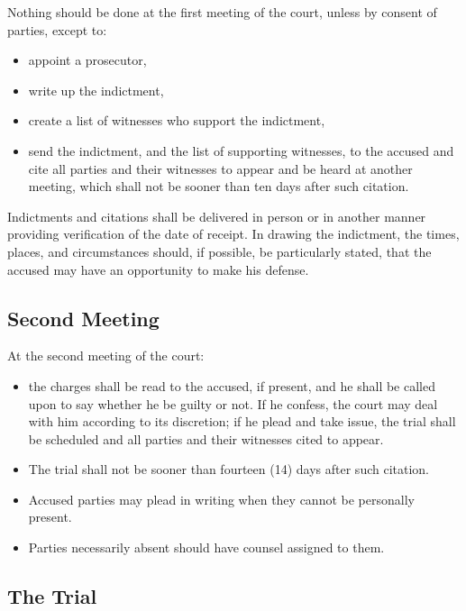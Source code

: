 \documentclass[
]{book}
\providecommand{\tightlist}{%
  \setlength{\itemsep}{0pt}\setlength{\parskip}{0pt}}
\begin{document}
Nothing should be done at the first meeting of the court, unless by consent of parties, except to:

\begin{itemize}
\tightlist
\item
  appoint a prosecutor,
\item
  write up the indictment,
\item
  create a list of witnesses who support the indictment,
\item
  send the indictment, and the list of supporting witnesses, to the accused and cite all parties and their witnesses to appear and be heard at another meeting, which shall not be sooner than ten days after such citation.
\end{itemize}

Indictments and citations shall be delivered in person or in another manner providing verification of the date of receipt. In drawing the indictment, the times, places, and circumstances should, if possible, be particularly stated, that the accused may have an opportunity to make his defense.

\hypertarget{second-meeting}{%
\subsection{Second Meeting}\label{second-meeting}}

At the second meeting of the court:

\begin{itemize}
\tightlist
\item
  the charges shall be read to the accused, if present, and he shall be called upon to say whether he be guilty or not. If he confess, the court may deal with him according to its discretion; if he plead and take issue, the trial shall be scheduled and all parties and their witnesses cited to appear.
\item
  The trial shall not be sooner than fourteen (14) days after such citation.
\item
  Accused parties may plead in writing when they cannot be personally present.
\item
  Parties necessarily absent should have counsel assigned to them.
\end{itemize}

\hypertarget{the-trial}{%
\subsection{The Trial}\label{the-trial}}
\end{document}
